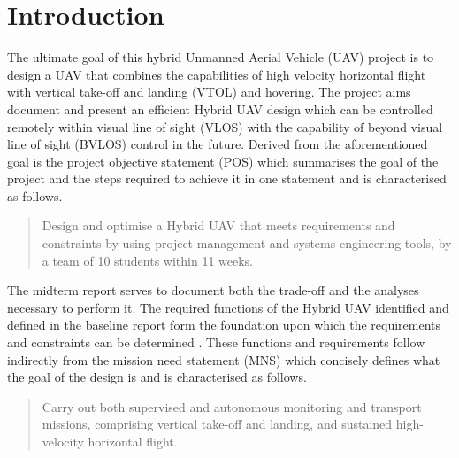 \chapter{Introduction}

The ultimate goal of this hybrid Unmanned Aerial Vehicle (UAV) project is to design a UAV that combines the capabilities of high velocity horizontal flight with vertical take-off and landing (VTOL) and hovering. The project aims document and present an efficient Hybrid UAV design which can be controlled remotely within visual line of sight (VLOS) with the capability of beyond visual line of sight (BVLOS) control in the future. Derived from the aforementioned goal is the project objective statement (POS) which summarises the goal of the project and the steps required to achieve it in one statement and is characterised as follows.


\begin{quote}
\begin{itshape}
Design and optimise a Hybrid UAV that meets requirements and constraints by using project management and systems engineering tools, by a team of 10 students within 11 weeks.
\end{itshape}
\end{quote}

The midterm report serves to document both the trade-off and the analyses necessary to perform it. The required functions of the Hybrid UAV identified and defined in the baseline report form the foundation upon which the requirements and constraints can be determined \cite{baseline}. These functions and requirements follow indirectly from the mission need statement (MNS) which concisely defines what the goal of the design is and is characterised as follows.

\begin{quote}
\begin{itshape}
Carry out both supervised and autonomous monitoring and transport missions, comprising vertical take-off and landing, and sustained high-velocity horizontal flight.
\end{itshape}
\end{quote}

